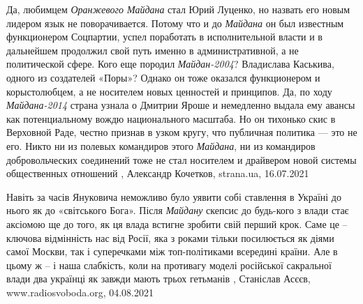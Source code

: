 Да, любимцем \emph{Оранжевого Майдана} стал Юрий Луценко, но назвать его новым
лидером язык не поворачивается. Потому что и до \emph{Майдана} он был известным
функционером Соцпартии, успел поработать в исполнительной власти и в дальнейшем
продолжил свой путь именно в административной, а не политической сфере.  Кого
еще породил \emph{Майдан-2004}? Владислава Каськива, одного из создателей
«Поры»?  Однако он тоже оказался функционером и корыстолюбцем, а не носителем
новых ценностей и принципов.  Да, по ходу \emph{Майдана-2014} страна узнала о
Дмитрии Яроше и немедленно выдала ему авансы как потенциальному вождю
национального масштаба. Но он тихонько скис в Верховной Раде, честно признав в
узком кругу, что публичная политика — это не его. Никто ни из полевых
командиров этого \emph{Майдана}, ни из командиров добровольческих соединений
тоже не стал носителем и драйвером новой системы общественных отношений
, 
Александр Кочетков, strana.ua, 16.07.2021


Навіть за часів Януковича неможливо було уявити собі ставлення в Україні до
нього як до «світського Бога». Після \emph{Майдану} скепсис до будь-кого з влади стає
аксіомою ще до того, як ця влада встигне зробити свій перший крок. Саме це –
ключова відмінність нас від Росії, яка з роками тільки посилюється як діями
самої Москви, так і суперечками між топ-політиками всередині країни. Але в
цьому ж – і наша слабкість, коли на противагу моделі російської сакральної
влади два українці як завжди мають трьох гетьманів
, 
Станіслав Асєєв, www.radiosvoboda.org, 04.08.2021

